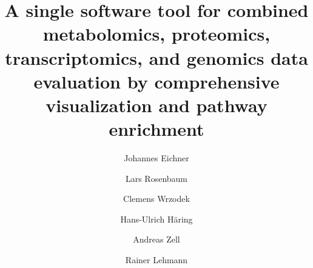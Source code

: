 \documentclass[final,5p,times,twocolumn]{elsarticle}
\newcommand\red[1]{{\color{red}#1}}
\begin{document}
\begin{frontmatter}



\title{\red{A single software tool for combined metabolomics, proteomics, transcriptomics, and genomics data evaluation by comprehensive visualization and pathway enrichment}}


\author[uni]{Johannes Eichner}
\author[uni]{Lars Rosenbaum}
\author[uni]{Clemens Wrzodek}
\author[idm,endo,dzd]{Hans-Ulrich H\"aring}
\author[uni]{Andreas Zell}
\author[idm,zentrallabor,dzd]{Rainer Lehmann}
\address[uni]{Center for Bioinformatics, University of T\"ubingen, T\"ubingen, Germany}
\address[idm]{Institute for Diabetes Research and Metabolic Diseases of the Helmholtz Centre Munich at the University of T\"ubingen, T\"ubingen, Germany}
\address[endo]{Division of Endocrinology, Diabetology, Vascular Medicine, Nephrology and Clinical Chemistry, Department of Internal Medicine IV, University Hospital T\"ubingen, T\"ubingen, Germany}
\address[zentrallabor]{Division of Clinical Chemistry and Pathobiochemistry, Department of Internal Medicine IV, University Hospital T\"ubingen, T\"ubingen, Germany}
\address[dzd]{German Center for Diabetes Research (DZD), Germany}



\end{frontmatter}
\end{document}
